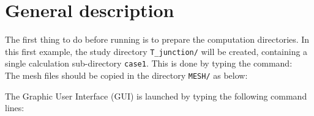 
%
%
%
%


\section{General description}
The first thing to do before running \CS is to prepare the computation
directories. In this first example, the study directory \texttt{T\_junction/} will be
created, containing a single calculation sub-directory \texttt{case1}.
This is done by typing the command:\\
The mesh files should be copied in the directory \texttt{MESH/} as below:\\

The \CS Graphic User Interface (GUI) is launched by typing the following command
lines:\\


